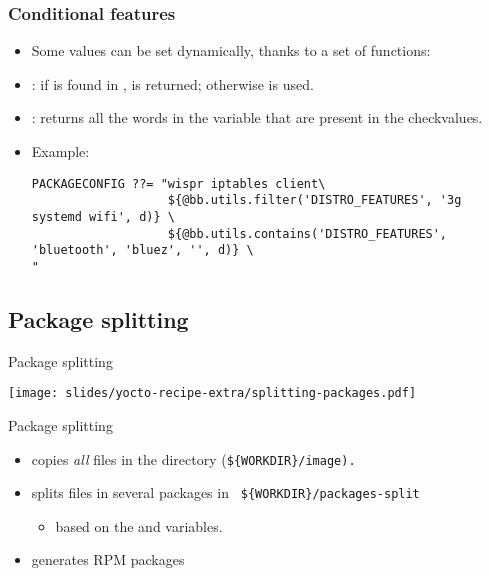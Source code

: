 \begin{frame}[fragile]
  \frametitle{Conditional features}
  \begin{itemize}
    \item Some values can be set dynamically, thanks to a set of
      functions:
    \item {}: if  is found in
      ,  is returned; otherwise
       is used.
    \item {}: returns
      all the words in the variable that are present in the
      checkvalues.
    \item Example:
      \begin{block}{}
      \fontsize{9}{9}\selectfont
      \begin{verbatim}
PACKAGECONFIG ??= "wispr iptables client\
                   ${@bb.utils.filter('DISTRO_FEATURES', '3g systemd wifi', d)} \
                   ${@bb.utils.contains('DISTRO_FEATURES', 'bluetooth', 'bluez', '', d)} \
"
      \end{verbatim}
      \end{block}
  \end{itemize}
\end{frame}

\subsection{Package splitting}

\begin{frame}{Package splitting}
  \begin{center}
    \texttt{[image: slides/yocto-recipe-extra/splitting-packages.pdf]}
  \end{center}
\end{frame}

\begin{frame}{Package splitting}
  \begin{itemize}
    \item {} copies {\em all} files in the  directory
      (\tt \$\{WORKDIR\}/image).
    \item {} splits files in several packages in \tt
      \$\{WORKDIR\}/packages-split
      \begin{itemize}
        \item based on the \code{PACKAGES} and \code{FILES} variables.
      \end{itemize}
    \item {} generates RPM packages
  \end{itemize}
\end{frame}

